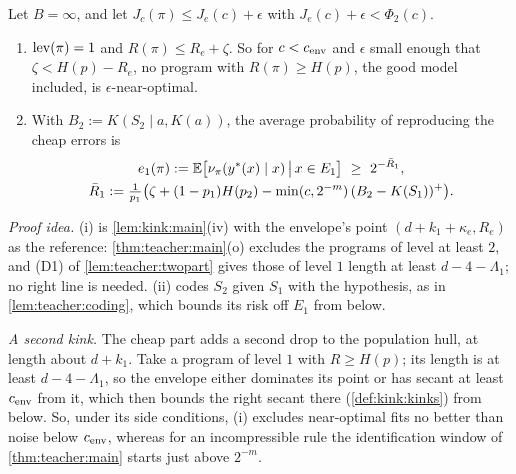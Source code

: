 \begin{proposition}\label{prop:limits:envelope}
Let $B=\infty$, and let $J_c(\pi)\le J_e(c)+\epsilon$ with $J_e(c)+\epsilon<\Phi_2(c)$.
\begin{enumerate}[label=(\roman*),itemsep=0pt,topsep=2pt]
\item $\operatorname{lev}(\pi)=1$ and $R(\pi)\le R_e+\zeta$. So for $c<c_{\rm env}$ and $\epsilon$ small enough that $\zeta<H(p)-R_e$, no program with $R(\pi)\ge H(p)$, the good model included, is $\epsilon$-near-optimal.
\item With $B_2:=K(S_2\mid a,K(a))$, the average probability of reproducing the cheap errors is
\begin{gather*}
e_1(\pi):=\Ex\big[\nu_\pi(y^*(x)\mid x)\,\big|\,x\in E_1\big]\ \ge\ 2^{-\bar R_1},\\
\bar R_1:=\tfrac1{p_1}\big(\zeta+(1-p_1)H(p_2)-\min(c,2^{-m})\,(B_2-K(S_1))^+\big).
\end{gather*}
\end{enumerate}
\end{proposition}

\emph{Proof idea.} (i) is \cref{lem:kink:main}(iv) with the envelope's point $(d+k_1+\kappa_e,R_e)$ as the reference: \cref{thm:teacher:main}(o) excludes the programs of level at least $2$, and (D1) of \cref{lem:teacher:twopart} gives those of level $1$ length at least $d-4-\Lambda_1$; no right line is needed. (ii) codes $S_2$ given $S_1$ with the hypothesis, as in \cref{lem:teacher:coding}, which bounds its risk off $E_1$ from below.

\emph{A second kink.} The cheap part adds a second drop to the population hull, at length about $d+k_1$. Take a program of level $1$ with $R\ge H(p)$; its length is at least $d-4-\Lambda_1$, so the envelope either dominates its point or has secant at least $c_{\rm env}$ from it, which then bounds the right secant there (\cref{def:kink:kinks}) from below. So, under its side conditions, (i) excludes near-optimal fits no better than noise below $c_{\rm env}$, whereas for an incompressible rule the identification window of \cref{thm:teacher:main} starts just above $2^{-m}$.


